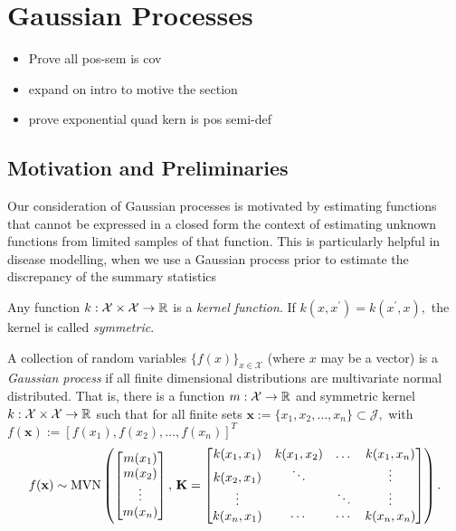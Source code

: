 \chapter{Gaussian Processes}

\begin{itemize}
    \item Prove all pos-sem is cov
    \item expand on intro to motive the section
    \item prove exponential quad kern is pos semi-def
\end{itemize}

\section{Motivation and Preliminaries}

Our consideration of Gaussian processes is motivated by estimating functions that cannot be expressed in a closed form the context of estimating unknown functions from limited samples of that function. This is particularly helpful in disease modelling, when we use a Gaussian process prior to estimate the discrepancy of the summary statistics

\begin{definition}\label{def:kernel}
    Any function $k:\mathcal{X}\times\mathcal{X}\to\mathbb{R}$ is a
    \emph{kernel function}. If $k(x, x^\prime) = k(x^\prime, x),$ the kernel is
    called \emph{symmetric}.
\end{definition}

\begin{definition}\label{def:gp}
    A collection of random variables $\{f(x)\}_{x\in\mathcal{X}}$
    (where $x$ may be a vector) is a \emph{Gaussian process} if all finite
    dimensional distributions are multivariate normal distributed. That is,
    there is a function $m:\mathcal{X}\to\mathbb{R}$ and symmetric kernel
    $k:\mathcal{X}\times\mathcal{X}\to \mathbb{R}$ such that for all finite sets
    $\mathbf{x} :=\{x_1, x_2, \dots, x_n\} \subset \mathcal{J},$ with
    $f(\mathbf{x}) := [f(x_1), f(x_2), \dots, f(x_n)]^T$
    $$f(\mathbf{x}) \sim
        \operatorname{MVN}\left(\begin{bmatrix}
            m(x_1) \\ m(x_2)\\ \vdots\\ m(x_n)
        \end{bmatrix},\, \mathbf{K} = \begin{bmatrix}
            k(x_1, x_1) & k(x_1, x_2) & \dots  & k(x_1, x_n) \\
            k(x_2, x_1) & \ddots      &        & \vdots      \\
            \vdots      &             & \ddots & \vdots      \\
            k(x_n, x_1) & \cdots      & \cdots & k(x_n, x_n)
        \end{bmatrix}\right).$$
\end{definition}

